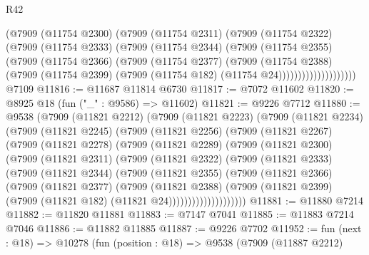 \begin{lexlean}{R42}
\begin{coremodule}
{                    (@7909
                      (@11754 @2300)
                      (@7909
                        (@11754 @2311)
                        (@7909
                          (@11754 @2322)
                          (@7909
                            (@11754 @2333)
                            (@7909
                              (@11754 @2344)
                              (@7909
                                (@11754 @2355)
                                (@7909
                                  (@11754 @2366)
                                  (@7909
                                    (@11754 @2377)
                                    (@7909
                                      (@11754 @2388)
                                      (@7909
                                        (@11754 @2399)
                                        (@7909 (@11754 @182) (@11754 @24))))))))))))))))))))
    @7109
@11816 := @11687 @11814 @6730
@11817 := @7072 @11602
@11820 := @8925 @18 (fun ("_" : @9586) => @11602)
@11821 := @9226 @7712
@11880 := @9538
    (@7909
      (@11821 @2212)
      (@7909
        (@11821 @2223)
        (@7909
          (@11821 @2234)
          (@7909
            (@11821 @2245)
            (@7909
              (@11821 @2256)
              (@7909
                (@11821 @2267)
                (@7909
                  (@11821 @2278)
                  (@7909
                    (@11821 @2289)
                    (@7909
                      (@11821 @2300)
                      (@7909
                        (@11821 @2311)
                        (@7909
                          (@11821 @2322)
                          (@7909
                            (@11821 @2333)
                            (@7909
                              (@11821 @2344)
                              (@7909
                                (@11821 @2355)
                                (@7909
                                  (@11821 @2366)
                                  (@7909
                                    (@11821 @2377)
                                    (@7909
                                      (@11821 @2388)
                                      (@7909
                                        (@11821 @2399)
                                        (@7909 (@11821 @182) (@11821 @24))))))))))))))))))))
@11881 := @11880 @7214
@11882 := @11820 @11881
@11883 := @7147 @7041
@11885 := @11883 @7214 @7046
@11886 := @11882 @11885
@11887 := @9226 @7702
@11952 := fun (next : @18) =>
  @10278
    (fun (position : @18) =>
    @9538
      (@7909
        (@11887 @2212)
}
\end{coremodule}
\end{lexlean}
